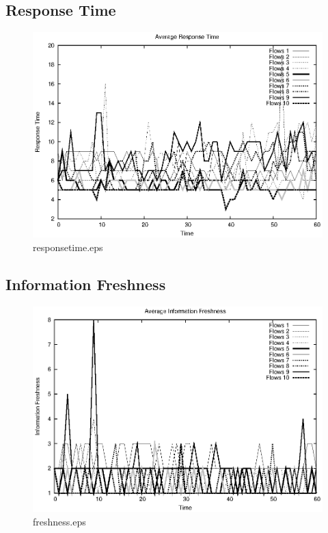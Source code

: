 \documentclass{elsart}
\begin{document}
\clearpage
\subsection{Response Time}

\begin{figure}[ht]
\centering
\includegraphics{Scenario5PullFromEntityCompact/responsetime.eps}
\caption{responsetime.eps}\label{fig:responsetime}
\end{figure}

\clearpage
\subsection{Information Freshness}

\begin{figure}[ht]
\centering
\includegraphics{Scenario5PullFromEntityCompact/freshness.eps}
\caption{freshness.eps}\label{fig:freshness}
\end{figure}
\end{document}
